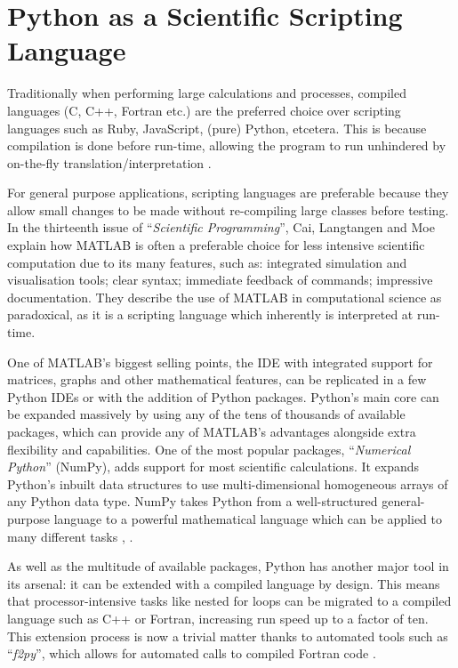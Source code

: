 \documentclass{report}
\newcommand{\tit}[1]{\textit{#1}}
\newcommand{\propernoun}[1]{\enquote{\tit{#1}}}
\begin{document}
    
    \section{Python as a Scientific Scripting Language}
    Traditionally when performing large calculations and processes, compiled languages (C, C++, Fortran etc.) are the preferred choice over scripting languages such as Ruby, JavaScript, (pure) Python, etcetera. This is because compilation is done before run-time, allowing the program to run unhindered by on-the-fly translation/interpretation \cite{Cai2005}.
    
    For general purpose applications, scripting languages are preferable because they allow small changes to be made without re-compiling large classes before testing. In the thirteenth issue of \propernoun{Scientific Programming}, Cai, Langtangen and Moe \cite{Cai2005} explain how MATLAB is often a preferable choice for less intensive scientific computation due to its many features, such as: integrated simulation and visualisation tools; clear syntax; immediate feedback of commands; impressive documentation. They describe the use of MATLAB in computational science as paradoxical, as it is a scripting language which inherently is interpreted at run-time.
    
    One of MATLAB's biggest selling points, the IDE with integrated support for matrices, graphs and other mathematical features, can be replicated in a few Python IDEs or with the addition of Python packages. Python's main core can be expanded massively by using any of the tens of thousands of available packages, which can provide any of MATLAB's advantages alongside extra flexibility and capabilities. One of the most popular packages, \propernoun{Numerical Python} (NumPy), adds support for most scientific calculations. It expands Python's inbuilt data structures to use multi-dimensional homogeneous arrays of any Python data type. NumPy takes Python from a well-structured general-purpose language to a powerful mathematical language which can be applied to many different tasks \cite{Cai2005}, \cite{Oliphant2006}.
    
    As well as the multitude of available packages, Python has another major tool in its arsenal: it can be extended with a compiled language by design. This means that processor-intensive tasks like nested for loops can be migrated to a compiled language such as C++ or Fortran, increasing run speed up to a factor of ten. This extension process is now a trivial matter thanks to automated tools such as \propernoun{f2py}, which allows for automated calls to compiled Fortran code \cite{Oliphant2006}.
    
\end{document}
